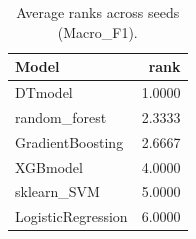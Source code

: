 \begin{table}[t]
\centering
\begin{tabular}{lr}
\toprule
Model & rank \\
\midrule
DTmodel & 1.0000 \\
random_forest & 2.3333 \\
GradientBoosting & 2.6667 \\
XGBmodel & 4.0000 \\
sklearn_SVM & 5.0000 \\
LogisticRegression & 6.0000 \\
\bottomrule
\end{tabular}
\caption{Average ranks across seeds (Macro_F1).}
\label{tab:avg_rank_Macro_F1}
\end{table}